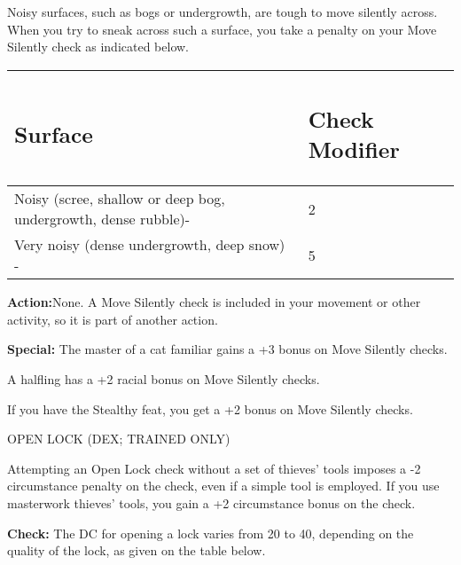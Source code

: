 \documentclass{article}
\begin{document}
Noisy surfaces, such as bogs or undergrowth, are tough to move silently across. 
When you try to sneak across such a surface, you take a penalty on your Move Silently 
check as indicated below.

\vspace{12pt}
\begin{tabular}{|>{\raggedright}p{254pt}|>{\raggedright}p{70pt}|}
\hline
\subsection*{S\textbf{urface }} & \subsection*{C\textbf{heck Modifier}}\tabularnewline
\hline
Noisy (scree, shallow or deep bog, undergrowth, dense rubble)- & 2\tabularnewline
\hline
Very noisy (dense undergrowth, deep snow) - & 5\tabularnewline
\hline
\end{tabular}

\vspace{12pt}
\textbf{Action:}None. A Move Silently check is included in your movement or other 
activity, so it is part of another action.

\textbf{Special:} The master of a cat familiar gains a +3 bonus on Move Silently 
checks.

A halfling has a +2 racial bonus on Move Silently checks.

If you have the Stealthy feat, you get a +2 bonus on Move Silently checks.

\vspace{12pt}
OPEN LOCK (DEX; TRAINED ONLY)

Attempting an Open Lock check without a set of thieves' tools imposes a -2 circumstance 
penalty on the check, even if a simple tool is employed. If you use masterwork 
thieves' tools, you gain a +2 circumstance bonus on the check.

\textbf{Check:} The DC for opening a lock varies from 20 to 40, depending on the 
quality of the lock, as given on the table below.
\end{document}
